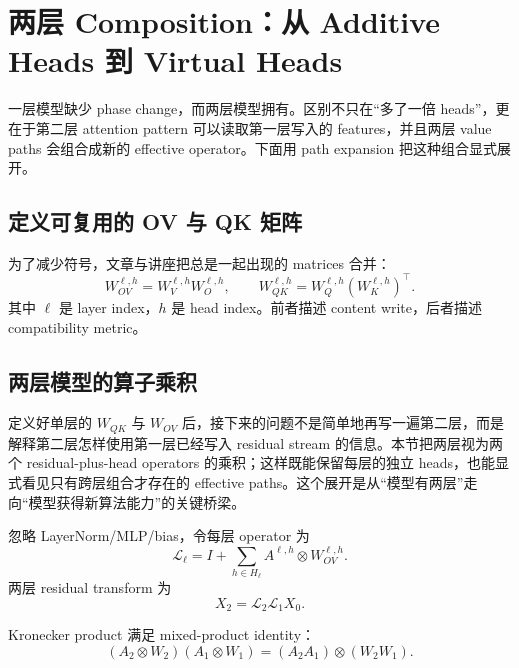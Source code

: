 \section{两层 Composition：从 Additive Heads 到 Virtual Heads}

一层模型缺少 phase change，而两层模型拥有。区别不只在“多了一倍 heads”，更在于第二层 attention pattern 可以读取第一层写入的 features，并且两层 value paths 会组合成新的 effective operator。下面用 path expansion 把这种组合显式展开。


\subsection{定义可复用的 OV 与 QK 矩阵}

为了减少符号，文章与讲座把总是一起出现的 matrices 合并：
\[
W_{OV}^{\ell,h}=W_V^{\ell,h}W_O^{\ell,h},
\qquad
W_{QK}^{\ell,h}=W_Q^{\ell,h}(W_K^{\ell,h})^{\top}.
\]
其中 $\ell$ 是 layer index，$h$ 是 head index。前者描述 content write，后者描述 compatibility metric。


\subsection{两层模型的算子乘积}

定义好单层的 $W_{QK}$ 与 $W_{OV}$ 后，接下来的问题不是简单地再写一遍第二层，而是解释第二层怎样使用第一层已经写入 residual stream 的信息。本节把两层视为两个 residual-plus-head operators 的乘积；这样既能保留每层的独立 heads，也能显式看见只有跨层组合才存在的 effective paths。这个展开是从“模型有两层”走向“模型获得新算法能力”的关键桥梁。

忽略 LayerNorm/MLP/bias，令每层 operator 为
\[
\mathcal{L}_{\ell}
=I+\sum_{h\in H_{\ell}}A^{\ell,h}\otimes W_{OV}^{\ell,h}.
\]
两层 residual transform 为
\[
X_2=\mathcal{L}_2\mathcal{L}_1X_0.
\]


Kronecker product 满足 mixed-product identity：
\[
(A_2\otimes W_2)(A_1\otimes W_1)
=(A_2A_1)\otimes(W_2W_1).
\]

